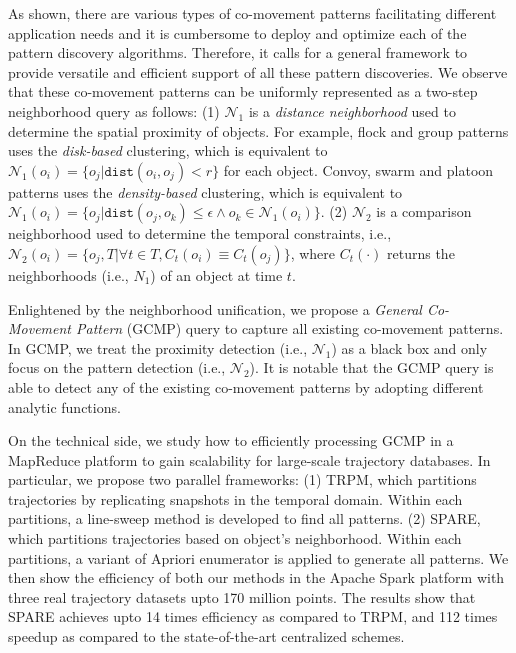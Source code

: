 As shown, there are various types of co-movement patterns facilitating different application needs and it is cumbersome to deploy and optimize each of the pattern discovery algorithms. Therefore, it calls for a general framework to provide versatile and efficient support of all these pattern discoveries. We observe that 
these co-movement patterns can be uniformly represented as a two-step neighborhood query as follows:
	(1) $\mathcal{N}_1$ is a \emph{distance neighborhood} used to determine the spatial proximity of objects. For example,  flock and group patterns uses the \emph{disk-based} clustering, which is equivalent to $\mathcal{N}_1(o_i)= \{o_j | \mathtt{dist}(o_i,o_j) < r \}$ for each object. Convoy, swarm and platoon patterns uses the \emph{density-based} clustering, which is equivalent to $\mathcal{N}_1(o_i)= \{o_j | \mathtt{dist}(o_j,o_k) \leq \epsilon \wedge o_k \in \mathcal{N}_1(o_i)\}$.
	(2) $\mathcal{N}_2$ is a comparison neighborhood used to determine the temporal constraints, i.e., $\mathcal{N}_2(o_i)=\{o_j, T | \forall t \in T, C_t(o_i) \equiv C_t(o_j)\}$, where $C_t(\cdot)$ returns the neighborhoods (i.e., $N_1$) of an object at time $t$.

Enlightened by the neighborhood unification, we propose a \emph{General Co-Movement Pattern} (GCMP)
query to capture all existing co-movement patterns. In GCMP, we treat the proximity detection (i.e., $\mathcal{N}_1$) as
a black box and only focus on the pattern detection (i.e., $\mathcal{N}_2$). It is notable that the GCMP
query is able to detect any of the existing co-movement patterns by adopting different analytic functions.



On the technical side, we study how to efficiently processing GCMP in a MapReduce platform to gain scalability for large-scale trajectory databases. In particular, we propose two parallel frameworks: (1) TRPM, which partitions trajectories by replicating snapshots in the temporal domain. Within each partitions, a line-sweep method is developed to find all patterns. (2) SPARE, which partitions trajectories based on object's neighborhood. Within each partitions, a variant of Apriori enumerator is applied to generate all patterns. We then show the efficiency of both our methods in the Apache Spark platform with three real trajectory datasets upto 170 million points. The results show that SPARE achieves upto 14 times efficiency as compared to TRPM, and 112 times speedup as compared to the state-of-the-art centralized schemes.